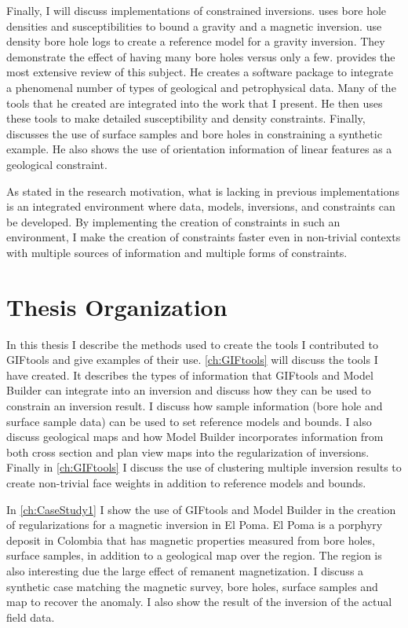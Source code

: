 Finally, I will discuss implementations of constrained inversions. \cite{phillips2001thesis} uses bore hole densities and susceptibilities to bound a gravity and a magnetic inversion. \cite{farquharson2008geologically} use density bore hole logs to create a reference model for a gravity inversion. They demonstrate the effect of having many bore holes versus only a few. \cite{williams2008geologically}  provides the most extensive review of this subject. He creates a software package to integrate a phenomenal number of types of geological and petrophysical data. Many of the tools that he created are integrated into the work that I present. He then uses these tools to make detailed susceptibility and density constraints. Finally, \cite{Lelievre2009Integrating} discusses the use of surface samples and bore holes in constraining a synthetic example. He also shows the use of orientation information of linear features as a geological constraint. 

As stated in the research motivation, what is lacking in previous implementations is an integrated environment where data, models, inversions, and constraints can be developed. By implementing the creation of constraints in such an environment, I make the creation of constraints faster even in non-trivial contexts with multiple sources of information and multiple forms of constraints.

\section{Thesis Organization}
\label{sec:Thesis Organization}
		
In this thesis I describe the methods used to create the tools I contributed to GIFtools and give examples of their use. \autoref{ch:GIFtools} will discuss the tools I have created. It  describes the types of information that GIFtools and Model Builder can integrate into an inversion and discuss how they can be used to constrain an inversion result. I discuss how sample information (bore hole and surface sample data) can be used to set reference models and bounds. I also discuss geological maps and how Model Builder incorporates information from both cross section and plan view maps into the regularization of inversions. Finally in \autoref{ch:GIFtools}  I discuss the use of clustering multiple inversion results to create non-trivial face weights in addition to reference models and bounds.

In \autoref{ch:CaseStudy1} I show the use of GIFtools and Model Builder in the creation of regularizations for a magnetic inversion in El Poma. El Poma is a porphyry deposit in Colombia that has magnetic properties measured from bore holes, surface samples, in addition to a geological map over the region. The region is also interesting due the large effect of remanent magnetization. I discuss a synthetic case matching the magnetic survey, bore holes, surface samples and map to recover the anomaly. I also show the result of the inversion of the actual field data.

